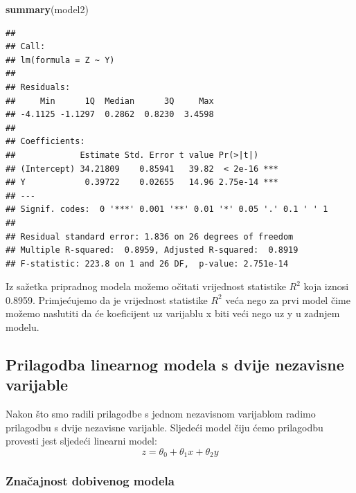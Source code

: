 \documentclass[]{article}
\newenvironment{Shaded}{\begin{snugshade}}{\end{snugshade}}
\newcommand{\KeywordTok}[1]{\textcolor[rgb]{0.13,0.29,0.53}{\textbf{{#1}}}}
\newcommand{\StringTok}[1]{\textcolor[rgb]{0.31,0.60,0.02}{{#1}}}
\newcommand{\NormalTok}[1]{{#1}}
\begin{document}
\begin{Shaded}
\begin{Highlighting}[]
\KeywordTok{summary}\NormalTok{(model2)}
\end{Highlighting}
\end{Shaded}

\begin{verbatim}
## 
## Call:
## lm(formula = Z ~ Y)
## 
## Residuals:
##     Min      1Q  Median      3Q     Max 
## -4.1125 -1.1297  0.2862  0.8230  3.4598 
## 
## Coefficients:
##             Estimate Std. Error t value Pr(>|t|)    
## (Intercept) 34.21809    0.85941   39.82  < 2e-16 ***
## Y            0.39722    0.02655   14.96 2.75e-14 ***
## ---
## Signif. codes:  0 '***' 0.001 '**' 0.01 '*' 0.05 '.' 0.1 ' ' 1
## 
## Residual standard error: 1.836 on 26 degrees of freedom
## Multiple R-squared:  0.8959, Adjusted R-squared:  0.8919 
## F-statistic: 223.8 on 1 and 26 DF,  p-value: 2.751e-14
\end{verbatim}

Iz sažetka pripradnog modela možemo očitati vrijednost statistike
\(R^2\) koja iznosi 0.8959. Primjećujemo da je vrijednost statistike
\(R^2\) veća nego za prvi model čime možemo naslutiti da će koeficijent
uz varijablu x biti veći nego uz y u zadnjem modelu.

\subsection{Prilagodba linearnog modela s dvije nezavisne
varijable}\label{prilagodba-linearnog-modela-s-dvije-nezavisne-varijable}

Nakon što smo radili prilagodbe s jednom nezavisnom varijablom radimo
prilagodbu s dvije nezavisne varijable. Sljedeći model čiju ćemo
prilagodbu provesti jest sljedeći linearni model:
\[z = \theta_0 + \theta_1 x + \theta_2 y \]

\begin{Shaded}
\end{Shaded}

\subsubsection{Značajnost dobivenog
modela}\label{znacajnost-dobivenog-modela}
\end{document}
